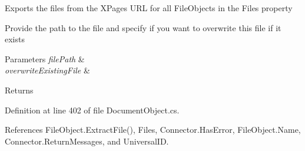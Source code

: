 Exports the files from the X\+Pages U\+RL for all File\+Objects in the Files property 

Provide the path to the file and specify if you want to overwrite this file if it exists


\begin{DoxyParams}{Parameters}
{\em file\+Path} & \\
\hline
{\em overwrite\+Existing\+File} & \\
\hline
\end{DoxyParams}
\begin{DoxyReturn}{Returns}

\end{DoxyReturn}


Definition at line 402 of file Document\+Object.\+cs.



References File\+Object.\+Extract\+File(), Files, Connector.\+Has\+Error, File\+Object.\+Name, Connector.\+Return\+Messages, and Universal\+ID.


